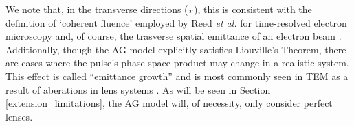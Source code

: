 We note that, in the transverse directions (${\scriptscriptstyle T}$), this is consistent with the definition of `coherent fluence' employed by Reed \textit{et al.} \cite{reed_evolution_2009} for time-resolved electron microscopy and, of course, the trasverse spatial emittance of an electron beam \cite{jensen_theoretical_2006,siwick_ultrafast_2002}.
Additionally, though the AG model explicitly satisfies Liouville's Theorem, there are cases where the pulse's phase space product may change in a realistic system.
This effect is called ``emittance growth'' and is most commonly seen in TEM as a result of aberations in lens systems \cite{oshea_reversible_1998}.
As will be seen in Section \ref{extension_limitations}, the AG model will, of necessity, only consider perfect lenses.

